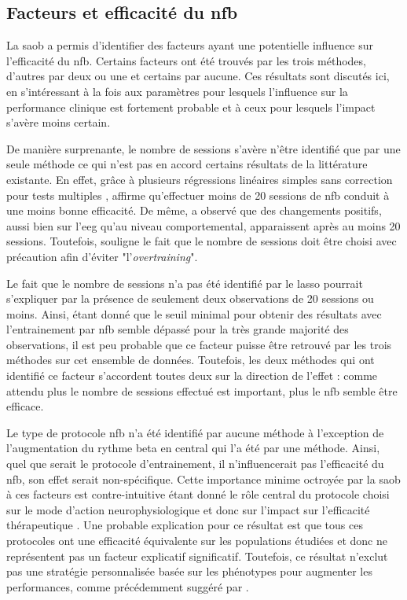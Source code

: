 \subsection{Facteurs et efficacité du \gls{nfb}}

La \gls{saob} a permis d'identifier des facteurs ayant une potentielle influence sur l'efficacité du \gls{nfb}. Certains facteurs ont été trouvés par les trois méthodes,
d'autres par deux ou une et certains par aucune. Ces résultats sont discutés ici, en s'intéressant à la fois aux paramètres pour lesquels l'influence sur la performance
clinique est fortement probable et à ceux pour lesquels l'impact s'avère moins certain. 

De manière surprenante, le nombre de sessions s'avère n'être identifié que par une seule méthode ce qui n'est pas en accord certains résultats de la littérature existante. 
En effet, grâce à plusieurs régressions linéaires 
simples sans correction pour tests multiples \citep{Arns2009}, \citet{Arns2014} affirme qu'effectuer moins de 20 sessions de \gls{nfb} conduit à une moins bonne efficacité. De même,
\citet{Vernon2004} a observé que des changements positifs, aussi bien sur l'\gls{eeg} qu'au niveau comportemental, apparaissent après au moins 20 sessions. Toutefois, \citep{Enriquez2017}
souligne le fait que le nombre de sessions doit être choisi avec précaution afin d'éviter "l'\textit{overtraining}". 


Le fait que le nombre de sessions n'a pas été identifié par le \gls{lasso}
pourrait s'expliquer par la présence de seulement deux observations de 20 sessions ou moins. Ainsi, étant donné que le seuil minimal pour obtenir des résultats avec l'entrainement
par \gls{nfb} semble dépassé pour la très grande majorité des observations, il est peu probable que ce facteur puisse être retrouvé par les trois méthodes sur cet ensemble de données. 
Toutefois, les deux méthodes qui ont identifié ce facteur s'accordent toutes deux sur la direction de l'effet : comme attendu plus le nombre de sessions effectué est important, 
plus le \gls{nfb} semble être efficace. 

Le type de protocole \gls{nfb} n'a été identifié par aucune méthode à l'exception de l'augmentation du rythme beta en central qui l'a été par une méthode. Ainsi, quel que serait 
le protocole d'entrainement, il n'influencerait pas l'efficacité du \gls{nfb}, son effet serait non-spécifique. Cette importance minime octroyée par la \gls{saob} à ces facteurs
est contre-intuitive étant donné le rôle central du protocole choisi sur le mode d'action neurophysiologique et donc sur l'impact sur l'efficacité thérapeutique \citep{Vernon2004}. Une probable 
explication pour ce résultat est que tous ces protocoles ont une efficacité équivalente sur les populations étudiées et donc ne représentent pas un facteur explicatif significatif. 
Toutefois, ce résultat n'exclut pas une stratégie personnalisée basée sur les phénotypes pour augmenter les performances, comme précédemment suggéré par \citet{Alkoby2017}.

